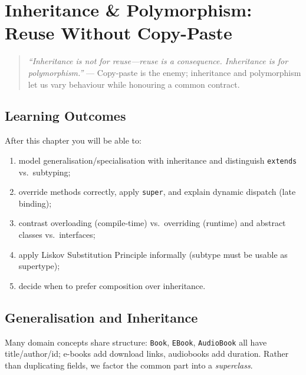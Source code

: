 \chapter{Inheritance \& Polymorphism: Reuse Without Copy-Paste}
\label{ch:inheritance}

\begin{quote}
\emph{``Inheritance is not for reuse---reuse is a consequence. Inheritance is for polymorphism.''} --- Copy-paste is the enemy; inheritance and polymorphism let us vary behaviour while honouring a common contract.
\end{quote}

\noindent{}
\vspace{0.4em}

\section*{Learning Outcomes}
After this chapter you will be able to:
\begin{enumerate}[label=(L\arabic*)]
    \item model generalisation/specialisation with inheritance and distinguish \texttt{extends} vs.\ subtyping;
    \item override methods correctly, apply \texttt{super}, and explain dynamic dispatch (late binding);
    \item contrast overloading (compile-time) vs.\ overriding (runtime) and abstract classes vs.\ interfaces;
    \item apply Liskov Substitution Principle informally (subtype must be usable as supertype);
    \item decide when to prefer composition over inheritance.
\end{enumerate}

\section{Generalisation and Inheritance}
\label{sec:generalisation}
Many domain concepts share structure: \texttt{Book}, \texttt{EBook}, \texttt{AudioBook} all have title/author/id; e-books add download links, audiobooks add duration. Rather than duplicating fields, we factor the common part into a \emph{superclass}.

